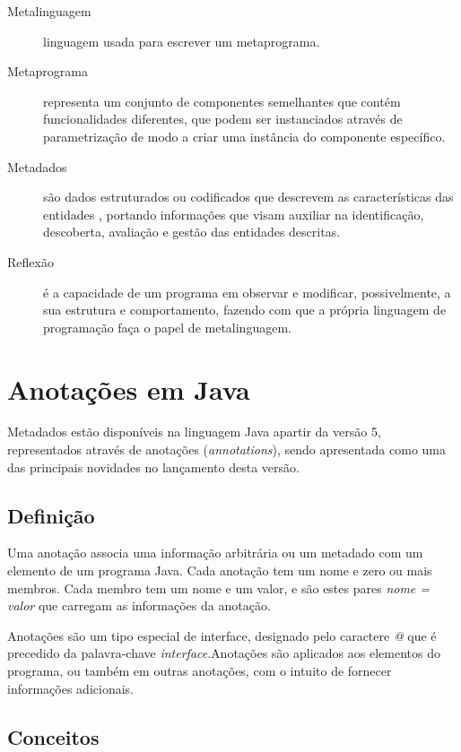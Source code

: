 \documentclass[tc,openright]{iiufrgs}
\begin{document}
\begin{description}
\item [Metalinguagem]  linguagem usada para escrever um metaprograma.
\item [Metaprograma ] representa um conjunto de componentes semelhantes que contém funcionalidades diferentes, que podem ser instanciados através de parametrização de modo a criar uma instância do componente específico. \cite{damavsevivcius2008taxonomy}
\item [Metadados] são dados estruturados ou codificados que descrevem as características das entidades , portando informações que visam auxiliar na identificação,  descoberta, avaliação e gestão das entidades descritas.\cite{american1999task}
\item [Reflexão] é a capacidade de um programa em observar e modificar, possivelmente, a sua estrutura e comportamento, fazendo com que a própria linguagem de programação faça o papel de metalinguagem.\cite{malenfant1996tutorial}
\end{description}

\section{Anotações em Java}
Metadados estão disponíveis na linguagem Java apartir da versão 5,  representados através de anotações (\textit{annotations}), sendo apresentada como uma das principais novidades no lançamento desta versão.
\subsection{Definição}

Uma anotação associa uma informação arbitrária ou um metadado com um elemento de um programa Java. Cada anotação tem um nome e zero ou mais membros. Cada membro tem um nome e um valor, e são
estes pares \textit{nome = valor} que carregam as informações da anotação. \cite{flanagan2005java}

Anotações são um tipo especial de interface, designado pelo caractere \textit{@} que é precedido da palavra-chave \textit{interface}.Anotações são aplicados aos elementos do programa, ou também em outras anotações, com o intuito de fornecer informações adicionais.\cite{arnold2000java}

\subsection{Conceitos}
\end{document}
